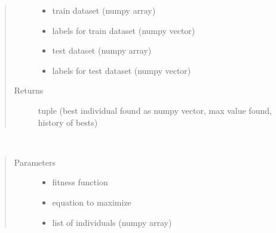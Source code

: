 \documentclass[letterpaper,10pt,english]{sphinxmanual}
\begin{document}
\begin{fulllineitems}
\begin{fulllineitems}
\begin{quote}
\begin{description}
\begin{itemize}
\item {} 
 \textendash{} train dataset (numpy array)

\item {} 
 \textendash{} labels for train dataset (numpy vector)

\item {} 
 \textendash{} test dataset (numpy array)

\item {} 
 \textendash{} labels for test dataset (numpy vector)

\end{itemize}

\item[{Returns}] \leavevmode
tuple (best individual found as numpy vector, max value found, history of bests)

\end{description}\end{quote}

\end{fulllineitems}


\begin{fulllineitems}
\label{\detokenize{index:genetic_optimizer.GeneticNeuralOptimizer.best_of_generation}}~\begin{quote}\begin{description}
\item[{Parameters}] \leavevmode\begin{itemize}
\item {} 
 \textendash{} fitness function

\item {} 
 \textendash{} equation to maximize

\item {} 
 \textendash{} list of individuals (numpy array)

\end{itemize}


\end{description}
\end{quote}
\end{fulllineitems}
\end{fulllineitems}
\end{document}
